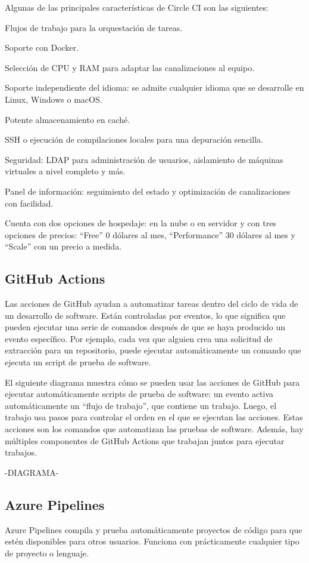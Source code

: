 Algunas de las principales características de Circle CI son las siguientes:
\begin{compactitem}
    \item Flujos de trabajo para la orquestación de tareas.
    \item Soporte con Docker.
    \item Selección de CPU y RAM para adaptar las canalizaciones al equipo.
    \item Soporte independiente del idioma: se admite cualquier idioma que se desarrolle en Linux, Windows o macOS.
    \item Potente almacenamiento en caché.
    \item SSH o ejecución de compilaciones locales para una depuración sencilla.
    \item Seguridad: LDAP para administración de usuarios, aislamiento de máquinas virtuales a nivel completo y más.
    \item Panel de información: seguimiento del estado y optimización de canalizaciones con facilidad.
\end{compactitem}
Cuenta con dos opciones de hospedaje: en la nube o en servidor y con tres opciones de precios: “Free” 0 dólares al mes, “Performance” 30 dólares al mes y “Scale” con un precio a medida.

\subsection{GitHub Actions}
Las acciones de GitHub ayudan a automatizar tareas dentro del ciclo de vida de un desarrollo de software. Están controladas por eventos, lo que significa que pueden ejecutar una serie de comandos después de que se haya producido un evento específico. Por ejemplo, cada vez que alguien crea una solicitud de extracción para un repositorio, puede ejecutar automáticamente un comando que ejecuta un script de prueba de software.

El siguiente diagrama muestra cómo se pueden usar las acciones de GitHub para ejecutar automáticamente scripts de prueba de software: un evento activa automáticamente un “flujo de trabajo”, que contiene un trabajo. Luego, el trabajo usa pasos para controlar el orden en el que se ejecutan las acciones. Estas acciones son los comandos que automatizan las pruebas de software. Además, hay múltiples componentes de GitHub Actions que trabajan juntos para ejecutar trabajos.

-DIAGRAMA-

\subsection{Azure Pipelines}
Azure Pipelines compila y prueba automáticamente proyectos de código para que estén disponibles para otros usuarios. Funciona con prácticamente cualquier tipo de proyecto o lenguaje.


